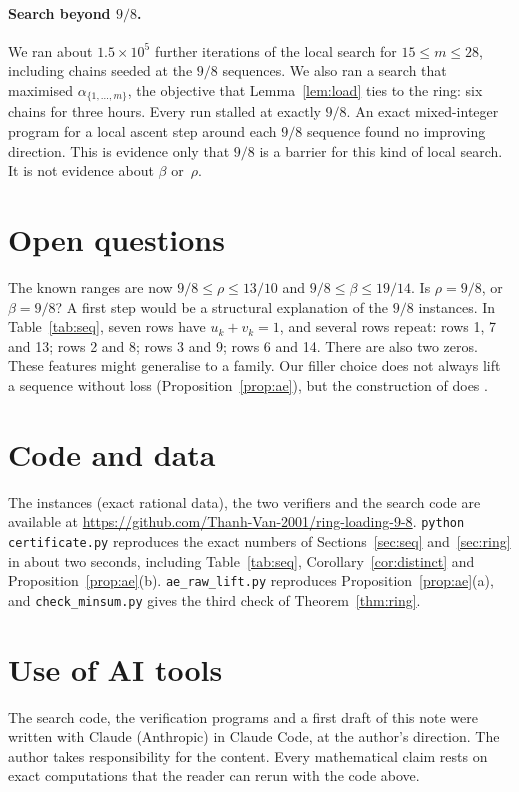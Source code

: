\documentclass[11pt]{article}
\theoremstyle{plain}
\theoremstyle{definition}
\theoremstyle{remark}
\begin{document}
\paragraph{Search beyond $9/8$.}
We ran about $1.5\times10^5$ further iterations of the local search for $15\le m\le 28$, including chains seeded at the $9/8$ sequences.
We also ran a search that maximised $\alpha_{\{1,\dots,m\}}$, the objective that Lemma~\ref{lem:load} ties to the ring: six chains for three hours.
Every run stalled at exactly $9/8$.
An exact mixed-integer program for a local ascent step around each $9/8$ sequence found no improving direction.
This is evidence only that $9/8$ is a barrier for this kind of local search. It is not evidence about $\beta$ or~$\rho$.

\section{Open questions}

The known ranges are now $9/8\le\rho\le13/10$ and $9/8\le\beta\le19/14$.
Is $\rho=9/8$, or $\beta=9/8$?
A first step would be a structural explanation of the $9/8$ instances. In Table~\ref{tab:seq}, seven rows have $u_k+v_k=1$, and several rows repeat: rows 1, 7 and 13; rows 2 and 8; rows 3 and 9; rows 6 and 14. There are also two zeros. These features might generalise to a family.
Our filler choice does not always lift a sequence without loss (Proposition~\ref{prop:ae}), but the construction of \cite[Lemma~7]{Dau22} does \cite{Mak26,Roz26}.

\section*{Code and data}
The instances (exact rational data), the two verifiers and the search code are available at \url{https://github.com/Thanh-Van-2001/ring-loading-9-8}.
\texttt{python certificate.py} reproduces the exact numbers of Sections~\ref{sec:seq} and~\ref{sec:ring} in about two seconds, including Table~\ref{tab:seq}, Corollary~\ref{cor:distinct} and Proposition~\ref{prop:ae}(b).
\texttt{ae\_raw\_lift.py} reproduces Proposition~\ref{prop:ae}(a), and \texttt{check\_minsum.py} gives the third check of Theorem~\ref{thm:ring}.

\section*{Use of AI tools}
The search code, the verification programs and a first draft of this note were written with Claude (Anthropic) in Claude Code, at the author's direction.
The author takes responsibility for the content.
Every mathematical claim rests on exact computations that the reader can rerun with the code above.
\end{document}
